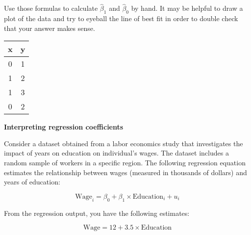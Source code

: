 \documentclass[12pt]{exam}
\begin{document}
\begin{questions}
Use those formulas to calculate $\hat{\beta}_{1}$ and $\hat{\beta}_{0}$ by hand. 
It may be helpful to draw a plot of the data and try to eyeball the line of best fit in order to double check that your answer makes sense.

\begin{center}
    \begin{tabular}{cc}
        \toprule
        \textbf{x} & \textbf{y} \\
        \midrule
        0 & 1 \\
        1 & 2 \\ 
        1 & 3 \\
        0 & 2 \\
        \bottomrule
    \end{tabular}
\end{center}

\newpage

\question
    \textbf{Interpreting regression coefficients}

    Consider a dataset obtained from a labor economics study that investigates the impact of years on education on individual's wages. 
    The dataset includes a random sample of workers in a specific region. 
    The following regression equation estimates the relationship between wages (measured in thousands of dollars) and years of education:

$$
    \text{Wage}_{i} = \beta_{0} + \beta_{1} \times \text{Education}_{i} + u_{i}
$$

From the regression output, you have the following estimates:

$$
    \text{Wage} = 12 + 3.5 \times \text{Education}
$$

\end{questions}
\end{document}
